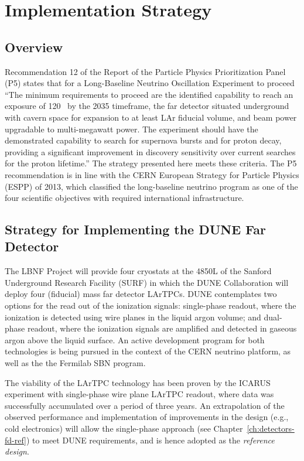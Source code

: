
\chapter{Implementation Strategy}
\label{ch:detectors-strategy}

\section{Overview}

Recommendation 12 of the Report of the Particle Physics Prioritization
Panel (P5) states that for a Long-Baseline Neutrino Oscillation
Experiment to proceed ``The minimum requirements to proceed are the
identified capability to reach an exposure of
120~\ktMWyr{} by the 2035 timeframe, the far detector
situated underground with cavern space for expansion to at least 
LAr fiducial volume, and  beam power upgradable to
multi-megawatt power. The experiment should have the demonstrated
capability to search for supernova bursts and for proton decay,
providing a significant improvement in discovery sensitivity over
current searches for the proton lifetime.''  The strategy presented
here meets these criteria.  The P5 recommendation is in line with the CERN
European Strategy for Particle Physics (ESPP) of 2013, which
classified the long-baseline neutrino program as one of the four
scientific objectives with required international infrastructure.

\section{Strategy for Implementing the DUNE Far Detector}
\label{sec:detectors-strategy-FD}
The LBNF Project will provide four cryostats at the 4850L of the Sanford
Underground Research Facility (SURF) in which the DUNE Collaboration
will deploy four  (fiducial) mass far detector LArTPCs. 
DUNE contemplates two options for the
read out of the ionization signals: single-phase readout, where the
ionization is detected using wire planes in the liquid argon volume;
and dual-phase readout, where the ionization signals are amplified and
detected in gaseous argon above the liquid surface.  An active
development program for both technologies is being pursued in the
context of the CERN neutrino platform, as well as the
the Fermilab SBN program.

The viability of the LArTPC technology has been proven by the ICARUS
experiment with single-phase wire plane LArTPC readout, where data was
successfully accumulated over a period of three years.  An
extrapolation of the observed performance and implementation of
improvements in the design (e.g., cold electronics) will allow the
single-phase approach (see
Chapter~\ref{ch:detectors-fd-ref}) to meet DUNE requirements, and
is hence adopted as the \textit{reference design}. 

